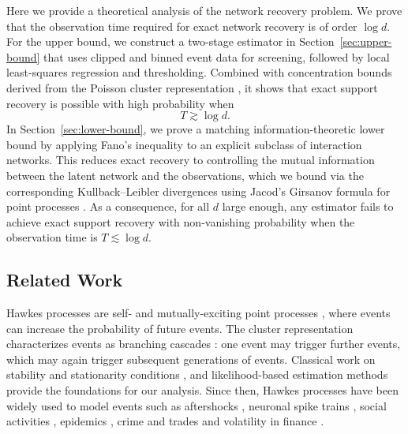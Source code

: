 \documentclass{article}
\begin{document}
Here we provide a theoretical analysis of the network recovery problem. 
We prove that the observation time required for exact network recovery is of order $\log d$.
For the upper bound, we construct a two-stage estimator in Section~\ref{sec:upper-bound} that uses clipped and binned event data for screening, followed by local least-squares regression and thresholding. Combined with concentration bounds derived from the Poisson cluster representation \cite{hawkes1974cluster}, it shows that exact support recovery is possible with high probability when
\[
T \gtrsim   \log d .
\]
In Section~\ref{sec:lower-bound}, we prove a matching information-theoretic lower bound by applying Fano's inequality \cite{gerchinovitz2020fano} to an explicit subclass of interaction networks. This reduces exact recovery to controlling the mutual information between the latent network and the observations, which we bound via the corresponding Kullback--Leibler divergences using Jacod’s Girsanov formula for point processes \cite{jacod1975multivariate}.
As a consequence, for all $d$ large enough, any estimator fails to achieve exact support recovery with non-vanishing probability when the observation time is  $T\lesssim\log d$. 

\subsection*{Related Work}
Hawkes processes are self- and mutually-exciting point processes \cite{hawkes1971spectra}, where events can increase the probability of future events. 
The cluster representation characterizes events as branching cascades \cite{hawkes1974cluster}: one event may trigger further events, which may again trigger subsequent generations of events.
Classical work on stability and stationarity conditions \cite{bremaud1996stability, bremaud2002rate}, and likelihood-based estimation methods \cite{ogata1978estimators, ozaki1979maximum} provide the foundations for our analysis.
Since then, Hawkes processes have been widely used to model events such as aftershocks \cite{nandan2022are}, neuronal spike trains \cite{kobayashi2019reconstructing}, social activities \cite{crane2008robust, rizoiu2017expecting, chen2018marked}, epidemics \cite{meyer2012space, unwin2021using}, crime \cite{mohler2011self, clark2018modeling, zhuang2019semiparametric} and trades and volatility in finance \cite{bacry2015hawkes, ait2015modeling, bondi2024rough}.
\end{document}
